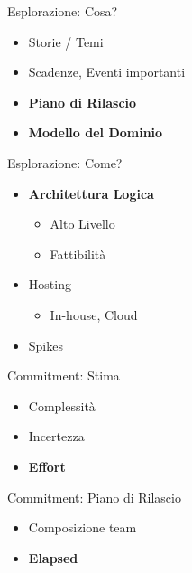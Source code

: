 \documentclass[compress, red, 14pt]{beamer}
\begin{document}
	\begin{frame}{Esplorazione: Cosa?}
		\begin{itemize}
			\item Storie / Temi
			\item Scadenze, Eventi importanti
		\end{itemize}

		\begin{itemize}
			\item \textbf{Piano di Rilascio}
			\item \textbf{Modello del Dominio}
		\end{itemize}
	\end{frame}

	\begin{frame}{Esplorazione: Come?}
		\begin{itemize}
			\item \textbf{Architettura Logica}
			\begin{itemize}
				\item Alto Livello
				\item Fattibilità
			\end{itemize}
			\item Hosting
			\begin{itemize}
				\item In-house, Cloud
			\end{itemize}
			\item Spikes
		\end{itemize}

	\end{frame}

	\begin{frame}{Commitment: Stima}
		\begin{itemize}
			\item Complessità
			\item Incertezza
		\end{itemize}

		\begin{itemize}
			\item \textbf{Effort}
		\end{itemize}
	\end{frame}

	\begin{frame}{Commitment: Piano di Rilascio}
		\begin{itemize}
			\item Composizione team
		\end{itemize}

		\begin{itemize}
			\item \textbf{Elapsed}
		\end{itemize}
	\end{frame}
	
\end{document}
